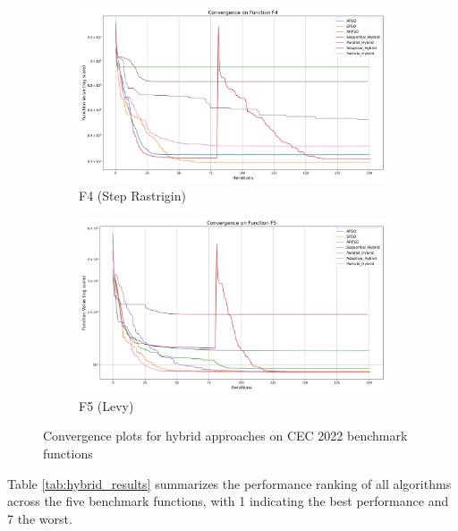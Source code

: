 \documentclass[conference]{IEEEtran}
\begin{document}
\begin{figure}[htbp]
\vspace{0.5cm}
\begin{subfigure}{0.32\linewidth}
    \centering
    \includegraphics[width=\linewidth]{../plots/exploitation/hybrid_convergence_f4.png}
    \caption{F4 (Step Rastrigin)}
    \label{fig:hybrid_conv_f4}
\end{subfigure}
\hfill
\begin{subfigure}{0.32\linewidth}
    \centering
    \includegraphics[width=\linewidth]{../plots/exploitation/hybrid_convergence_f5.png}
    \caption{F5 (Levy)}
    \label{fig:hybrid_conv_f5}
\end{subfigure}

\caption{Convergence plots for hybrid approaches on CEC 2022 benchmark functions}
\label{fig:hybrid_convergence}
\end{figure}

Table \ref{tab:hybrid_results} summarizes the performance ranking of all algorithms across the five benchmark functions, with 1 indicating the best performance and 7 the worst.
\end{document}
